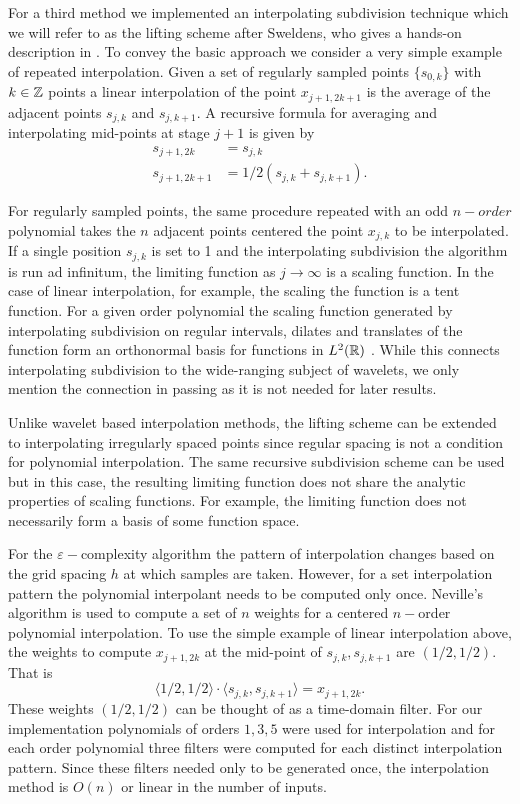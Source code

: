 For a third method we implemented an interpolating 
subdivision technique which we will refer to 
as the lifting scheme after Sweldens, who gives
a hands-on description in \cite{sweldens1996}. To 
convey the basic approach we consider a very simple 
example of repeated interpolation. Given a set 
of regularly sampled points $\{ s_{0,k} \}$ with 
$k \in \mathbb{Z}$ points a linear interpolation of the 
point $x_{j+1, 2k + 1}$ is the average of the 
adjacent points $s_{j,k}$ and $s_{j,k+1}$. A
recursive formula for averaging and interpolating 
mid-points at stage $j+1$ is given by
\begin{align*}
      s_{j+1, 2k} &= s_{j,k} \\
      s_{j + 1, 2k+1} &= 1/2(s_{j,k} + s_{j,k+1}).
 \end{align*}

For regularly sampled points, the 
same procedure repeated with an odd 
$n-order$ polynomial takes the $n$ adjacent 
points centered the point $x_{j,k}$ to be 
interpolated. If a single position $s_{j,k}$ is
set to 1 and the interpolating subdivision 
the algorithm is run ad infinitum, the limiting function as 
$j \to \infty$ is a scaling function. In the case 
of linear interpolation, for example, the scaling
the function is a tent function. For a given 
order polynomial the scaling function generated 
by interpolating subdivision on regular intervals,
dilates and translates of the function
form an orthonormal basis for functions in $L^2(\mathbb R)$
\cite{sweldens1996}. 
While this connects interpolating subdivision to the wide-ranging subject of wavelets, we only mention the connection in passing as it is not needed for later results. 

Unlike wavelet based interpolation methods, the lifting scheme can be extended to interpolating
irregularly spaced points since regular spacing is not a condition for polynomial interpolation. The same recursive subdivision scheme
can be used but in this case, the resulting limiting function does not share the analytic properties of scaling functions. For example, the limiting function does not necessarily form a basis of some function space.

For the $\varepsilon-$complexity algorithm the pattern of interpolation changes based on the grid spacing $h$ at which samples are taken. 
However, for a set interpolation pattern the  
polynomial interpolant needs to be computed 
only once. Neville's algorithm is used 
to compute a set of $n$ weights for a centered 
$n-$order polynomial interpolation. To use the 
simple example of linear interpolation above, 
the weights to compute $x_{j+1, 2k}$ at the 
mid-point of $s_{j, k}, s_{j, k+1}$ are 
$(1/2, 1/2)$. That is 
\[
   \langle 1/2 , 1/2 \rangle \cdot 
   \langle s_{j, k}, s_{j, k+1} \rangle = x_{j+1, 2k}.  
\]
These weights $(1/2, 1/2)$ can be thought of 
as a time-domain filter. For our implementation 
polynomials of orders ${1,3,5}$ were used for 
interpolation and for each order polynomial 
three filters were computed for each distinct
interpolation pattern. Since these filters
 needed only to be generated once, the interpolation
method is $O(n)$ or linear in the number of inputs. 


